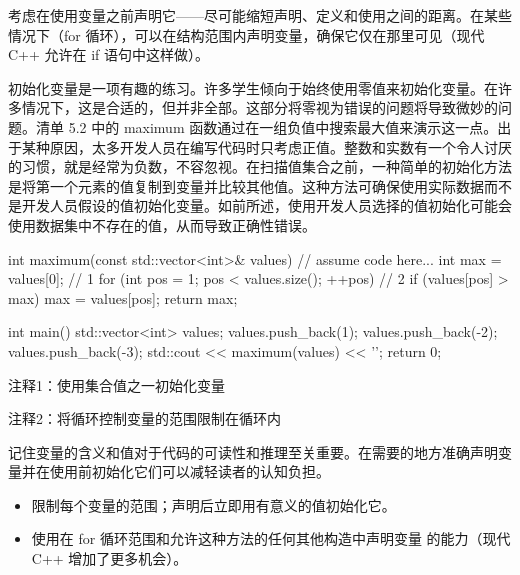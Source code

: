 
考虑在使用变量之前声明它——尽可能缩短声明、定义和使用之间的距离。在某些情况下（for 循环），可以在结构范围内声明变量，确保它仅在那里可见（现代 C++ 允许在 if 语句中这样做）。

初始化变量是一项有趣的练习。许多学生倾向于始终使用零值来初始化变量。在许多情况下，这是合适的，但并非全部。这部分将零视为错误的问题将导致微妙的问题。清单 5.2 中的 maximum 函数通过在一组负值中搜索最大值来演示这一点。出于某种原因，太多开发人员在编写代码时只考虑正值。整数和实数有一个令人讨厌的习惯，就是经常为负数，不容忽视。在扫描值集合之前，一种简单的初始化方法是将第一个元素的值复制到变量并比较其他值。这种方法可确保使用实际数据而不是开发人员假设的值初始化变量。如前所述，使用开发人员选择的值初始化可能会使用数据集中不存在的值，从而导致正确性错误。


\begin{cpp}
int maximum(const std::vector<int>& values) {
  // assume code here...
  int max = values[0]; // 1
  for (int pos = 1; pos < values.size(); ++pos) // 2
    if (values[pos] > max)
      max = values[pos];
  return max;
}

int main() {
  std::vector<int> values;
  values.push_back(1);
  values.push_back(-2);
  values.push_back(-3);
  std::cout << maximum(values) << '\n';
  return 0;
}
\end{cpp}

{\footnotesize
注释1：使用集合值之一初始化变量

注释2：将循环控制变量的范围限制在循环内
}

记住变量的含义和值对于代码的可读性和推理至关重要。在需要的地方准确声明变量并在使用前初始化它们可以减轻读者的认知负担。


\begin{itemize}
\item
限制每个变量的范围；声明后立即用有意义的值初始化它。

\item
使用在 for 循环范围和允许这种方法的任何其他构造中声明变量 的能力（现代 C++ 增加了更多机会）。
\end{itemize}












